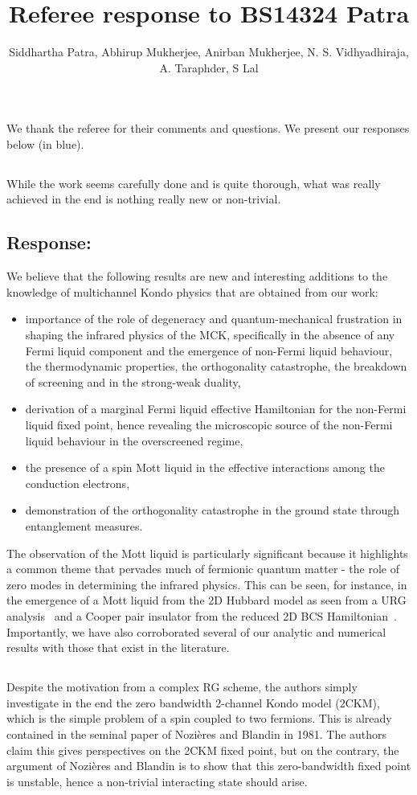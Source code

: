 \documentclass{article}
\author{Siddhartha Patra, Abhirup Mukherjee, Anirban Mukherjee, N. S. Vidhyadhiraja,\\ A. Taraphder, S Lal}
\title{Referee response to BS14324 Patra}
\newcommand{\response}[1]{{\color{blue}\subsection*{Response:}{#1}}}
\newcommand{\point}[1]{\subsection{}{#1}}
\begin{document}
\maketitle

We thank the referee for their comments and questions. We present our responses below (in blue).

\point{While the work seems carefully done and is quite thorough, what was really achieved in the end is nothing really new or non-trivial.}

\response{We believe that the following results are new and interesting additions to the knowledge of multichannel Kondo physics that are obtained from our work:
\begin{itemize}
	\item importance of the role of degeneracy and quantum-mechanical frustration in shaping the infrared physics of the MCK, specifically in the absence of any Fermi liquid component and the emergence of non-Fermi liquid behaviour, the thermodynamic properties, the orthogonality catastrophe, the breakdown of screening and in the strong-weak duality,
	\item derivation of a marginal Fermi liquid effective Hamiltonian for the non-Fermi liquid fixed point, hence revealing the microscopic source of the non-Fermi liquid behaviour in the overscreened regime,
	\item the presence of a spin Mott liquid in the effective interactions among the conduction electrons,
	\item demonstration of the orthogonality catastrophe in the ground state through entanglement measures.
\end{itemize}
The observation of the Mott liquid is particularly significant because it highlights a common theme that pervades much of fermionic quantum matter - the role of zero modes in determining the infrared physics. This can be seen, for instance, in the emergence of a Mott liquid from the 2D Hubbard model as seen from a URG analysis~\cite{anirbanmott1,anirbanmott2,mukherjeeMERG2022} and a Cooper pair insulator from the reduced 2D BCS Hamiltonian~\cite{siddharthacpi}. Importantly, we have also corroborated several of our analytic and numerical results with those that exist in the literature.
}

\point{Despite the motivation from a complex RG scheme, the authors simply investigate in the end the zero bandwidth 2-channel Kondo model (2CKM),  which is the simple problem of a spin coupled to two fermions. This is already contained in the seminal paper of Nozières and Blandin in 1981. The authors claim this gives perspectives on the 2CKM fixed point, but on the contrary, the argument of Nozières and Blandin is to show that this zero-bandwidth fixed point is unstable, hence a non-trivial interacting state should arise.
}
\end{document}
